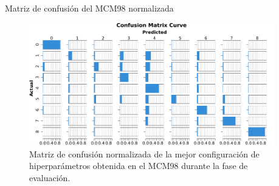 \begin{frame}{Matriz de confusión del MCM98 normalizada}


\begin{figure}[H]
    \centering
    \includegraphics[width=0.95\textwidth]{../Memoria/img/evaluacion/matrices_confusion/MCNorm_EVAL_MCM98.pdf}
    \caption{Matriz de confusión normalizada de la mejor configuración de hiperparámetros obtenida en el MCM98 durante la fase de evaluación.}
    \label{fig:MCNorm_EVAL_MCM98}
\end{figure}

\end{frame}


